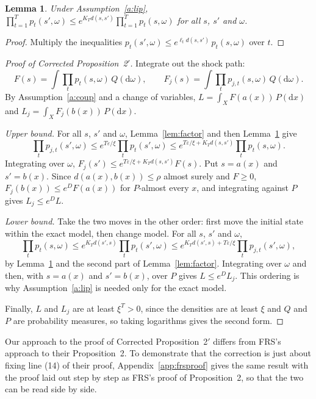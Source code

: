 \documentclass[11pt]{article}
\newtheorem{lemma}[theorem]{Lemma}
\theoremstyle{definition}
\theoremstyle{remark}
\newcommand{\dd}{\mathrm{d}}
\begin{document}
\begin{lemma}\label{lem:move}
Under Assumption~\ref{a:lip}, $\prod_{t=1}^T p_t(s',\omega) \le e^{K_T d(s,s')}\prod_{t=1}^T
p_t(s,\omega)$ for all $s$, $s'$ and $\omega$.
\end{lemma}

\begin{proof}
Multiply the inequalities $p_t(s',\omega) \le e^{\ell_t d(s,s')}\,p_t(s,\omega)$ over $t$.
\end{proof}

\begin{proof}[Proof of Corrected Proposition~2$'$]
Integrate out the shock path:
\[
  F(s) = \int \prod_t p_t(s,\omega)\,Q(\dd\omega), \qquad
  F_j(s) = \int \prod_t p_{j,t}(s,\omega)\,Q(\dd\omega).
\]
By Assumption~\ref{a:coup} and a change of variables, $L = \int_X F(a(x))\,P(\dd x)$ and $L_j = \int_X F_j(b(x))\,P(\dd x)$.

\emph{Upper bound.} For all $s$, $s'$ and $\omega$, Lemma~\ref{lem:factor} and then
Lemma~\ref{lem:move} give
\[
  \prod_t p_{j,t}(s',\omega) \le e^{T\varepsilon/\xi}\prod_t p_t(s',\omega)
  \le e^{T\varepsilon/\xi + K_T d(s,s')}\prod_t p_t(s,\omega).
\]
Integrating over $\omega$, $F_j(s') \le e^{T\varepsilon/\xi + K_T d(s,s')}F(s)$. Put $s = a(x)$ and
$s' = b(x)$. Since $d(a(x),b(x)) \le \rho$ almost surely and $F \ge 0$,
$F_j(b(x)) \le e^{D} F(a(x))$ for $P$-almost every $x$, and integrating against $P$ gives
$L_j \le e^{D} L$.

\emph{Lower bound.} Take the two moves in the other order: first move the initial state within the
exact model, then change model. For all $s$, $s'$ and $\omega$,
\[
  \prod_t p_t(s,\omega) \le e^{K_T d(s',s)}\prod_t p_t(s',\omega)
  \le e^{K_T d(s',s) + T\varepsilon/\xi}\prod_t p_{j,t}(s',\omega),
\]
by Lemma~\ref{lem:move} and the second part of Lemma~\ref{lem:factor}. Integrating over $\omega$
and then, with $s = a(x)$ and $s' = b(x)$, over $P$ gives $L \le e^{D}L_j$. This ordering is why
Assumption~\ref{a:lip} is needed only for the exact model.

Finally, $L$ and $L_j$ are at least $\xi^T > 0$, since the densities are at least $\xi$ and $Q$
and $P$ are probability measures, so taking logarithms gives the second form.
\end{proof}

\noindent Our approach to the proof of Corrected Proposition~2$'$ differs from FRS's approach to
their Proposition~2. To demonstrate that the correction is just about fixing line (14) of their
proof, Appendix~\ref{app:frsproof} gives the same result with the proof laid out step by step as
FRS's proof of Proposition~2, so that the two can be read side by side.
\end{document}

